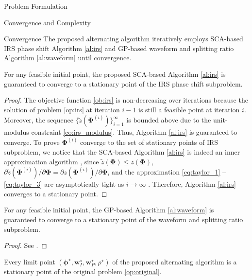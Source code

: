 \documentclass[journal]{IEEEtran}
\begin{document}
\begin{section}{Problem Formulation}
	\begin{subsection}{Convergence and Complexity}
		\begin{subsubsection}{Convergence}
			The proposed alternating algorithm iteratively employs SCA-based IRS phase shift Algorithm \ref{al:irs} and GP-based waveform and splitting ratio Algorithm \ref{al:waveform} until convergence.

			\begin{proposition}\label{pr:irs}
				For any feasible initial point, the proposed SCA-based Algorithm \ref{al:irs} is guaranteed to converge to a stationary point of the IRS phase shift subproblem.
			\end{proposition}

			\begin{proof}\label{pf:irs}
				The objective function \ref{ob:irs} is non-decreasing over iterations because the solution of problem \ref{op:irs} at iteration $i-1$ is still a feasible point at iteration $i$. Moreover, the sequence $\{\tilde{z}(\boldsymbol{\Phi}^{(i)})\}_{i=1}^{\infty}$ is bounded above due to the unit-modulus constraint \ref{co:irs_modulus}. Thus, Algorithm \ref{al:irs} is guaranteed to converge. To prove $\boldsymbol{\Phi}^{(i)}$ converge to the set of stationary points of IRS subproblem, we notice that the SCA-based Algorithm \ref{al:irs} is indeed an inner approximation algorithm \cite{Marks1978}, since $\tilde{z}(\boldsymbol{\Phi}) \le z(\boldsymbol{\Phi})$, $\partial\tilde{z}(\boldsymbol{\Phi}^{(i)})/\partial\boldsymbol{\Phi}=\partial z(\boldsymbol{\Phi}^{(i)})/\partial\boldsymbol{\Phi}$, and the approximation \ref{eq:taylor_1} -- \ref{eq:taylor_3} are asymptotically tight as $i \to \infty$ \cite{Adali2010,Li2013}. Therefore, Algorithm \ref{al:irs} converges to a stationary point.
			\end{proof}

			\begin{proposition}\label{pr:waveform}
				For any feasible initial point, the GP-based Algorithm \ref{al:waveform} is guaranteed to converge to a stationary point of the waveform and splitting ratio subproblem.
			\end{proposition}

			\begin{proof}\label{pf:waveform}
				See \cite{Clerckx2016a,Clerckx2018b}.
			\end{proof}

			\begin{proposition}\label{pr:ao}
				Every limit point $(\boldsymbol{\phi}^{\star},\boldsymbol{w}_I^{\star},\boldsymbol{w}_P^{\star},\rho^{\star})$ of the proposed alternating algorithm is a stationary point of the original problem \ref{op:original}.
			\end{proposition}


\end{subsubsection}
\end{subsection}
\end{section}
\end{document}
